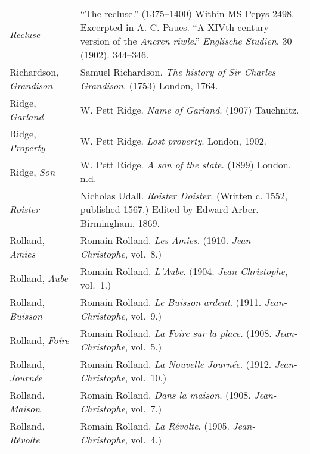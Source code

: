 \begin{longtable}{p{} p{}}
\textit{Recluse} & ``The recluse.'' (1375--1400) Within MS Pepys 2498. Excerpted in A. C. Paues. ``A XIVth-century version of the \textit{Ancren riwle}.'' \textit{Englische Studien}. 30 (1902). 344--346. \\ %

Richardson, \textit{Grandison} & Samuel Richardson. \textit{The history of Sir Charles Grandison}. (1753) London, 1764. \\

Ridge, \textit{Garland} & W. Pett Ridge. \textit{Name of Garland}. (1907) Tauchnitz. \\
Ridge, \textit{Property} & W. Pett Ridge. \textit{Lost property}. London, 1902. \\
Ridge, \textit{Son} & W. Pett Ridge. \textit{A son of the state}. (1899) London, n.d. \\

\textit{Roister} & Nicholas Udall. \textit{Roister Doister}. (Written c. 1552, published 1567.) Edited by Edward Arber. Birmingham, 1869. \\

Rolland, \textit{Amies} & Romain Rolland. \textit{Les Amies}. (1910. \textit{Jean-Christophe}, vol.~8.) \\ %
Rolland, \textit{Aube} & Romain Rolland. \textit{L'Aube}. (1904. \textit{Jean-Christophe}, vol.~1.) \\ %
Rolland, \textit{Buisson} & Romain Rolland. \textit{Le Buisson ardent}. (1911. \textit{Jean-Christophe}, vol.~9.) \\ %
Rolland, \textit{Foire} & Romain Rolland. \textit{La Foire sur la place}. (1908. \textit{Jean-Christophe}, vol.~5.) \\ %
Rolland, \textit{Journée} & Romain Rolland. \textit{La Nouvelle Journée}. (1912. \textit{Jean-Christophe}, vol.~10.) \\ %
Rolland, \textit{Maison} & Romain Rolland. \textit{Dans la maison}. (1908. \textit{Jean-Christophe}, vol.~7.) \\ %
Rolland, \textit{Révolte} & Romain Rolland. \textit{La Révolte}. (1905. \textit{Jean-Christophe}, vol.~4.) \\ %


\end{longtable}
